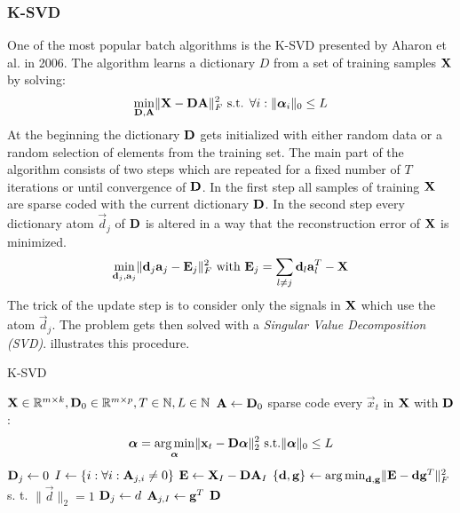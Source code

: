 \subsubsection{K-SVD}
\label{sec:k-svd}
One of the most popular batch algorithms is the K-SVD presented by
Aharon et al. in 2006\cite{Aharon2006}. The algorithm learns a dictionary $D$
from a set of training samples $\boldsymbol{\mathrm{X}}$ by solving:
\begin{equation*}
\min_{\boldsymbol{\mathrm{D}},\boldsymbol{\mathrm{A}}} \lVert \boldsymbol{\mathrm{X}} - \boldsymbol{\mathrm{D}}\boldsymbol{\mathrm{A}} \rVert^{2}_{F} \textrm{
s.t. }
\forall i : \lVert \boldsymbol{\mathrm{\alpha}}_i \rVert_{0} \leq L
\end{equation*}
At the beginning the dictionary $\boldsymbol{\mathrm{D}}$ gets initialized with either random
data or a random selection of elements from the training set. The main part of
the algorithm consists of two steps which are repeated for a fixed number of $T$
iterations or until convergence of $\boldsymbol{\mathrm{D}}$. In the first step all samples of
training $\boldsymbol{\mathrm{X}}$ are sparse coded with the current dictionary $\boldsymbol{\mathrm{D}}$. In
the second step every dictionary atom $\vec{d}_j$ of $\boldsymbol{\mathrm{D}}$ is altered in a
way that the reconstruction error of $\boldsymbol{\mathrm{X}}$ is minimized. 
\begin{equation*}
\min_{\boldsymbol{\mathrm{d}}_j,\boldsymbol{\mathrm{a}}_j} \lVert \boldsymbol{\mathrm{d}}_j\boldsymbol{\mathrm{a}}_j - \boldsymbol{\mathrm{E}}_j \rVert^{2}_{F}
\textrm{ with }
\boldsymbol{\mathrm{E}}_j = \sum_{l\neq j} \boldsymbol{\mathrm{d}}_l\boldsymbol{\mathrm{a}}_l^T - \boldsymbol{\mathrm{X}}
\end{equation*} 
The trick of the update step is to consider only the signals in $\boldsymbol{\mathrm{X}}$ which
use the atom $\vec{d}_j$. The problem gets then solved with a \emph{Singular
Value Decomposition (SVD)}. 
 illustrates this procedure. 

\begin{algorithm}[h]
\caption{K-SVD}
\label{alg:k-svd}
\begin{algorithmic}[1]
\REQUIRE $\boldsymbol{\mathrm{X}} \in \mathbb{R}^{m \times k}, \boldsymbol{\mathrm{D}}_0 \in \mathbb{R}^{m
\times p}, T \in \mathbb{N}, L \in \mathbb{N}$
\STATE $\boldsymbol{\mathrm{A}} \gets \boldsymbol{\mathrm{D}}_0$
\STATE sparse code every $\vec{x}_t$ in $\boldsymbol{\mathrm{X}}$ with $\boldsymbol{\mathrm{D}}$:
\begin{equation}
\boldsymbol{\mathrm{\alpha}} = \operatorname*{arg\,min}_{\boldsymbol{\mathrm{\alpha}}}\lVert
\boldsymbol{\mathrm{x}}_t - \boldsymbol{\mathrm{D}}\boldsymbol{\mathrm{\alpha}}\rVert_2^2 \text{ s.t.}
\lVert\boldsymbol{\mathrm{\alpha}}\rVert_0 \leq L
\end{equation}
\label{alg:k-svd_start}
\STATE $\boldsymbol{\mathrm{D}}_j \gets 0$
\STATE $I \gets \{ i : \forall i : \boldsymbol{\mathrm{A}}_{j,i} \neq 0 \}$
\STATE $\boldsymbol{\mathrm{E}} \gets \boldsymbol{\mathrm{X}}_I - \boldsymbol{\mathrm{D}}\boldsymbol{\mathrm{A}}_I$
\STATE $\{\boldsymbol{\mathrm{d}},\boldsymbol{\mathrm{g}}\} \gets \operatorname*{arg\,min}_{\boldsymbol{\mathrm{d}},\boldsymbol{\mathrm{g}}} \lVert \boldsymbol{\mathrm{E}}-
\boldsymbol{\mathrm{d}}\boldsymbol{\mathrm{g}}^T \rVert_F^{2}$ s. t. $\lVert
\vec{d} \rVert_{2} = 1$
\STATE $\boldsymbol{\mathrm{D}}_j \gets d$
\STATE $\boldsymbol{\mathrm{A}}_{j,I} \gets \boldsymbol{\mathrm{g}}^T$
\ENDFOR\label{alg:k-svd_end}
\ENDFOR
\RETURN $\boldsymbol{\mathrm{D}}$
\end{algorithmic}
\end{algorithm}

